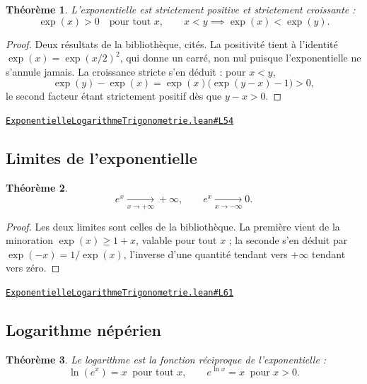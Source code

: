 \documentclass[11pt,a4paper]{article}
\theoremstyle{definition}
\theoremstyle{plain}
\newtheorem{theoreme}{Théorème}
\newcommand{\source}[2]{\par\smallskip\noindent\hfill{\footnotesize\href{#1}{\texttt{#2}}}\par\smallskip}
\begin{document}
\begin{theoreme}
L'exponentielle est strictement positive et strictement croissante :
\[ \exp(x) > 0 \quad \text{pour tout } x, \qquad
   x < y \implies \exp(x) < \exp(y) . \]
\end{theoreme}

\begin{proof}
Deux résultats de la bibliothèque, cités. La positivité tient à l'identité
$\exp(x) = \exp(x/2)^{2}$, qui donne un carré, non nul puisque l'exponentielle ne s'annule
jamais. La croissance stricte s'en déduit : pour $x < y$,
\[ \exp(y) - \exp(x) = \exp(x)\bigl(\exp(y - x) - 1\bigr) > 0 , \]
le second facteur étant strictement positif dès que $y - x > 0$.
\end{proof}
\source{https://github.com/Commutator-IO/learn-lean/blob/main/cours/02-lycee/05-exponentielle-logarithme-trigonometrie/ExponentielleLogarithmeTrigonometrie.lean\#L54}{ExponentielleLogarithmeTrigonometrie.lean\#L54}

\subsection{Limites de l'exponentielle}

\begin{theoreme}
\[ e^{x} \xrightarrow[x \to +\infty]{} +\infty , \qquad
   e^{x} \xrightarrow[x \to -\infty]{} 0 . \]
\end{theoreme}

\begin{proof}
Les deux limites sont celles de la bibliothèque. La première vient de la minoration
$\exp(x) \ge 1 + x$, valable pour tout $x$ ; la seconde s'en déduit par
$\exp(-x) = 1/\exp(x)$, l'inverse d'une quantité tendant vers $+\infty$ tendant vers zéro.
\end{proof}
\source{https://github.com/Commutator-IO/learn-lean/blob/main/cours/02-lycee/05-exponentielle-logarithme-trigonometrie/ExponentielleLogarithmeTrigonometrie.lean\#L61}{ExponentielleLogarithmeTrigonometrie.lean\#L61}

\subsection{Logarithme népérien}

\begin{theoreme}
Le logarithme est la fonction réciproque de l'exponentielle :
\[ \ln(e^{x}) = x \ \text{ pour tout } x, \qquad
   e^{\ln x} = x \ \text{ pour } x > 0 . \]
\end{theoreme}
\end{document}
